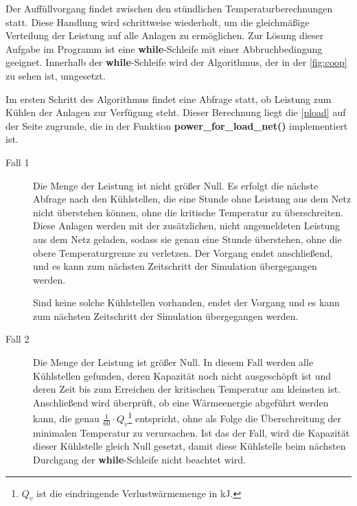 Der Auff\"ullvorgang findet zwischen den st\"undlichen Temperaturberechnungen
statt. Diese Handlung wird schrittweise wiederholt, um die gleichm\"a\ss ige
Verteilung der Leistung auf alle Anlagen zu erm\"oglichen. Zur L\"osung dieser
Aufgabe im Programm ist eine \textbf{while}-Schleife mit einer Abbruchbedingung
geeignet. Innerhalb der \textbf{while}-Schleife wird der Algorithmus, der in
der \cref{fig:coop} zu sehen ist, umgesetzt.

Im ersten Schritt des Algorithmus findet eine Abfrage statt, ob Leistung zum
K\"uhlen der Anlagen zur Verf\"ugung steht. Dieser Berechnung liegt die
\cref{pload} auf der Seite \pageref{pload} zugrunde, die in der Funktion
\textbf{power\_for\_load\_net()} implementiert ist.

\begin{description}
\item[Fall 1] Die Menge der Leistung ist nicht gr\"o\ss er Null. Es erfolgt die
n\"achste Abfrage nach den K\"uhlstellen, die eine Stunde ohne Leistung aus dem
Netz nicht \"uberstehen k\"onnen, ohne die kritische Temperatur zu
\"uberschreiten.  Diese Anlagen werden mit der zus\"atzlichen, nicht
angemeldeten Leistung aus dem Netz geladen, sodass sie genau eine Stunde
\"uberstehen, ohne die obere Temperaturgrenze zu verletzen. Der Vorgang endet
anschlie\ss end, und es kann zum n\"achsten Zeitschritt der Simulation
\"ubergegangen werden.

Sind keine solche K\"uhlstellen vorhanden, endet der Vorgang und es kann zum
n\"achsten Zeitschritt der Simulation \"ubergegangen werden.

\item[Fall 2] Die Menge der Leistung ist gr\"o\ss er Null. In diesem Fall werden
alle K\"uhlstellen gefunden, deren Kapazit\"at noch nicht
ausgesch\"opft ist und deren Zeit bis zum Erreichen der kritischen Temperatur am
kleinsten ist.  Anschlie\ss end wird \"uberpr\"uft, ob eine W\"armeenergie
abgef\"uhrt werden kann, die genau $\frac{1}{60}\cdot Q_v$\footnote{ $Q_v$ ist
die eindringende Verlustw\"armemenge in kJ.} entspricht, ohne als Folge die
\"Uberschreitung der minimalen Temperatur zu verursachen. Ist das der Fall, wird
die Kapazit\"at dieser K\"uhlstelle gleich Null gesetzt, damit diese
K\"uhlstelle beim n\"achsten Durchgang der \textbf{while}-Schleife nicht
beachtet wird.


\end{description}
